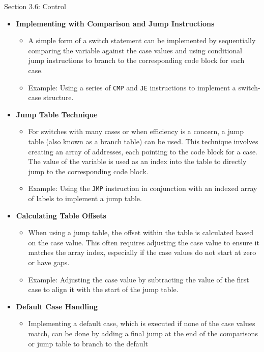 \begin{notes}{Section 3.6: Control}
    \begin{itemize}
        \item \textbf{Implementing with Comparison and Jump Instructions}
        \begin{itemize}
            \item A simple form of a switch statement can be implemented by sequentially comparing the variable against the case values and using conditional jump instructions to branch to the corresponding 
            code block for each case.
            \item Example: Using a series of \texttt{CMP} and \texttt{JE} instructions to implement a switch-case structure.
        \end{itemize}
        \item \textbf{Jump Table Technique}
        \begin{itemize}
            \item For switches with many cases or when efficiency is a concern, a jump table (also known as a branch table) can be used. This technique involves creating an array of addresses, each 
            pointing to the code block for a case. The value of the variable is used as an index into the table to directly jump to the corresponding code block.
            \item Example: Using the \texttt{JMP} instruction in conjunction with an indexed array of labels to implement a jump table.
        \end{itemize}
        \item \textbf{Calculating Table Offsets}
        \begin{itemize}
            \item When using a jump table, the offset within the table is calculated based on the case value. This often requires adjusting the case value to ensure it matches the array index, 
            especially if the case values do not start at zero or have gaps.
            \item Example: Adjusting the case value by subtracting the value of the first case to align it with the start of the jump table.
        \end{itemize}
        \item \textbf{Default Case Handling}
        \begin{itemize}
            \item Implementing a default case, which is executed if none of the case values match, can be done by adding a final jump at the end of the comparisons or jump table to branch to the default 

\end{itemize}
\end{itemize}
\end{notes}
